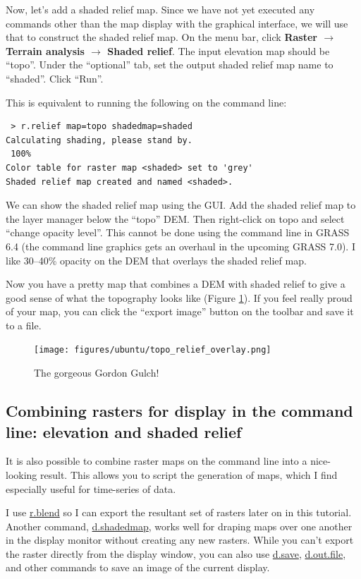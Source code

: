 \documentclass{book}
\begin{document}
Now, let's add a shaded relief map. Since we have not yet executed any commands other than the map display with the graphical interface, we will use that to construct the shaded relief map. On the menu bar, click {\bf Raster $\rightarrow$ Terrain analysis $\rightarrow$ Shaded relief}. The input elevation map should be ``topo''. Under the ``optional'' tab, set the output shaded relief map name to ``shaded''. Click ``Run''.

This is equivalent to running the following on the command line:
\begin{lstlisting}
 > r.relief map=topo shadedmap=shaded
Calculating shading, please stand by.
 100%
Color table for raster map <shaded> set to 'grey'
Shaded relief map created and named <shaded>.
\end{lstlisting}

We can show the shaded relief map using the GUI. Add the shaded relief map to the layer manager below the ``topo'' DEM. Then right-click on topo and select ``change opacity level''. This cannot be done using the command line in GRASS 6.4 (the command line graphics gets an overhaul in the upcoming GRASS 7.0). I like 30--40\% opacity on the DEM that overlays the shaded relief map.

Now you have a pretty map that combines a DEM with shaded relief to give a good sense of what the topography looks like (Figure \ref{fig:topo_relief_overlay}). If you feel really proud of your map, you can click the ``export image'' button on the toolbar and save it to a file.

\begin{figure}[h]
 \begin{center}
 \texttt{[image: figures/ubuntu/topo\_relief\_overlay.png]}
 \caption{The gorgeous Gordon Gulch!}
 \label{fig:topo_relief_overlay}
 \end{center}
\end{figure}

\subsection{Combining rasters for display in the command line: elevation and shaded relief \label{s:drastCLI}}

It is also possible to combine raster maps on the command line into a nice-looking result. This allows you to script the generation of maps, which I find especially useful for time-series of data.

I use \url{r.blend} so I can export the resultant set of rasters later on in this tutorial. Another command, \url{d.shadedmap}, works well for draping maps over one another in the display monitor without creating any new rasters. While you can't export the raster directly from the display window, you can also use \url{d.save}, \url{d.out.file}, and other commands to save an image of the current display.
\end{document}
